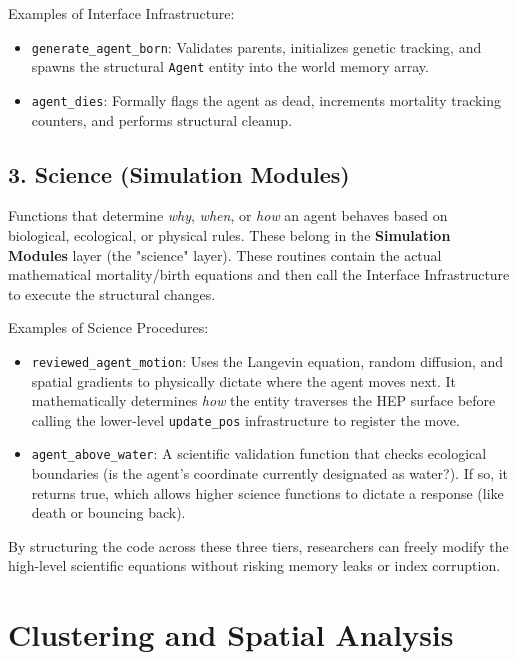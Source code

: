 Examples of Interface Infrastructure:
\begin{itemize}
    \item \texttt{generate\_agent\_born}: Validates parents, initializes genetic tracking, and spawns the structural \texttt{Agent} entity into the world memory array.
    \item \texttt{agent\_dies}: Formally flags the agent as dead, increments mortality tracking counters, and performs structural cleanup.
\end{itemize}

\subsection{3. Science (Simulation Modules)}
Functions that determine \textit{why}, \textit{when}, or \textit{how} an agent behaves based on biological, ecological, or physical rules. These belong in the \textbf{Simulation Modules} layer (the "science" layer). These routines contain the actual mathematical mortality/birth equations and then call the Interface Infrastructure to execute the structural changes.

Examples of Science Procedures:
\begin{itemize}
    \item \texttt{reviewed\_agent\_motion}: Uses the Langevin equation, random diffusion, and spatial gradients to physically dictate where the agent moves next. It mathematically determines \textit{how} the entity traverses the HEP surface before calling the lower-level \texttt{update\_pos} infrastructure to register the move.
    \item \texttt{agent\_above\_water}: A scientific validation function that checks ecological boundaries (is the agent's coordinate currently designated as water?). If so, it returns true, which allows higher science functions to dictate a response (like death or bouncing back).
\end{itemize}

By structuring the code across these three tiers, researchers can freely modify the high-level scientific equations without risking memory leaks or index corruption.

\section{Clustering and Spatial Analysis}

